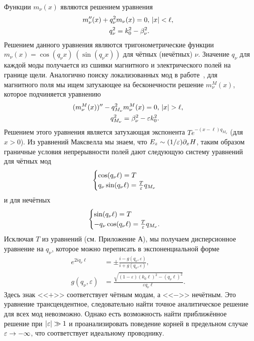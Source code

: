 Функции $m_\nu(x)$ являются 
решением уравнения 
\begin{align}
  m''_\nu(x) + q_{\nu}^{2}m_\nu(x) = 0, & \ \lvert x\rvert<\ell, \\
  q_\nu^2 = k_{0}^{2}-\beta_\nu^{2}.& \nonumber
\end{align}
Решением данного уравнения являются тригонометрические функции $m_\nu(x) = \cos(q_\nu x) \ (\sin(q_\nu x))$ для чётных (нечётных) $\nu$. Значение $q_\nu$ для каждой моды получается из сшивки
магнитного и электрического полей на границе щели.
Аналогично поиску локализованных мод в работе~\cite{sturman2007eigenmodes}, для магнитного поля мы ищем затухающее на бесконечности решение $m_\nu^M(x)$, которое подчиняется уравнению
\begin{align}
  (m^M_\nu(x))'' - q_{M_\nu}^{2}m^M_\nu(x) = 0, & \ \lvert x\rvert>\ell, \\
  q_{M_\nu}^{2} = \beta_\nu^{2}-\varepsilon k_{0}^{2}. &\nonumber
\end{align}
Решением этого уравнения является затухающая экспонента $T e^{-(x-\ell)q_{M_\nu} }$ (для $x>0$). 
Из уравнений Максвелла мы знаем, что $E_z \sim (1/\varepsilon) \partial_x H$, таким образом граничные условия непрерывности полей дают следующую систему уравнений для чётных мод 
\begin{equation}
    \begin{cases}
        \cos(q_\nu \ell) = T \\
        q_\nu \sin (q_\nu \ell)  = \frac{T}{\varepsilon} q_{M_\nu}
    \end{cases}
\end{equation}
и для нечётных
\begin{equation}
    \begin{cases}
        \sin(q_\nu \ell) = T \\
        -q_\nu \cos (q_\nu \ell)  = \frac{T}{\varepsilon} q_{M_\nu}. 
    \end{cases}
\end{equation}
Исключая $T$ из уравнений (см. Приложение А), мы получаем дисперсионное уравнение на $q_\nu$, которое можно переписать в экспоненциальной форме
\begin{align}
e^{2i q_\nu \ell} &= \pm \frac{i-g(q_\nu,\varepsilon)}{i+g(q_\nu,\varepsilon)},\label{eq:BoundCond} \\
g(q_\nu,\varepsilon) & = \frac{\sqrt{(1-\varepsilon)(k_0 \ell)^2 - (q_\nu \ell)^2}}{\varepsilon q_\nu \ell}.  \nonumber
\end{align}
Здесь знак <<$+$>> соответствует чётным модам, а <<$-$>> нечётным. Это уравнение трансцендентное, следовательно найти точное аналитическое решение
для всех мод невозможно. Однако есть возможность найти приближённое решение при  $\lvert\varepsilon\rvert \gg 1$ и проанализировать поведение корней в предельном случае $\varepsilon \to -\infty$, что соответствует идеальному проводнику.

